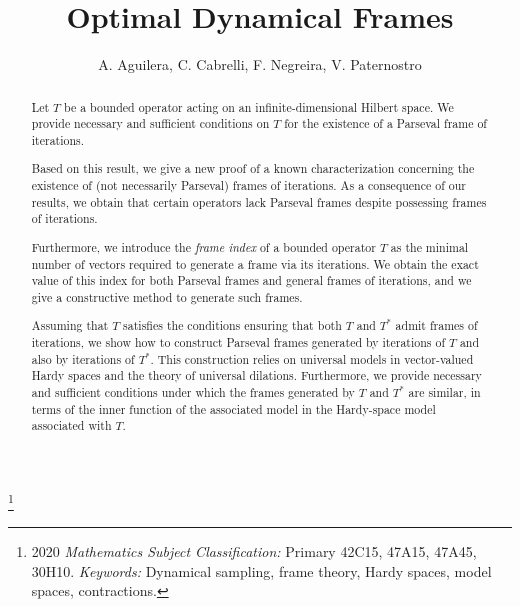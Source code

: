 \documentclass[a4paper,12pt]{amsart}
\theoremstyle{definition}
\newcommand{\coma}[1]{{\color{blue}#1}}%
\newcommand{\comc}[1]{{\color{red}#1}}%
\newcommand{\comf}[1]{{\color{cyan}*#1*}}%
\newcommand{\comv}[1]{{\color{orange}*#1*}}%
\begin{document}
\title{Optimal Dynamical Frames}

\let\thefootnote\relax\footnote{2020 {\em Mathematics Subject Classification:} Primary 42C15, 47A15, 47A45, 30H10. {\em Keywords:} Dynamical sampling, frame theory, Hardy spaces, model spaces, contractions.}


\author[A. Aguilera, C. Cabrelli, F. Negreira, V. Paternostro]{A. Aguilera, C. Cabrelli, F. Negreira, V. Paternostro}
\address{Departamento de Matem\'atica, Universidad de Buenos Aires, Instituto de Matem\'atica ``Luis Santal\'o'' (IMAS-CONICET-UBA), Buenos Aires, Argentina.}



\maketitle


\begin{abstract}
Let $T$ be a bounded operator acting on an infinite-dimensional Hilbert space. We provide necessary and sufficient conditions on $T$ for the existence of a Parseval frame of iterations.

Based on this result, we give a new proof of a known characterization concerning the existence of (not necessarily Parseval) frames of iterations. As a consequence of our results, we obtain that certain operators lack Parseval frames despite possessing frames of iterations.

Furthermore, we introduce the {\em frame index} of a bounded operator $T$ as the minimal number of vectors required to generate a frame via its iterations. We obtain the exact value of this index for both Parseval frames and general frames of iterations, and we give a constructive method to generate such frames.

Assuming that $T$ satisfies the conditions ensuring that both $T$ and $T^*$ admit frames of iterations, we show how to construct Parseval frames generated by iterations of $T$ and also by iterations of $T^*$. This construction relies on universal models in vector-valued Hardy spaces and the theory of universal dilations. Furthermore, we provide necessary and sufficient conditions under which the frames generated by $T$ and $T^*$ are similar, in terms of the inner function of the associated model in the Hardy-space model associated with $T$.
\end{abstract}
\end{document}
